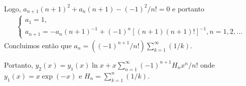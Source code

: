\documentclass[a4paper,12pt, leqno, answers]{exam}
\begin{document}
\begin{questions}
\begin{solution}
\begin{align*}
        \end{align*}
        Logo, $a_{n + 1} (n + 1)^2 + a_n (n + 1) - (-1)^2 / n! = 0$ e portanto
        \begin{align*}
            \begin{cases}
                a_1 = 1, \\
                a_{n + 1} = -a_n (n + 1)^{-1} + (-1)^n \left[ (n + 1) (n + 1)! \right]^{-1}, n = 1, 2, \ldots
            \end{cases}
        \end{align*}
        Concluimos ent\~{a}o que $a_n = \left( (-1)^{n + 1} / n! \right) \sum_{k = 1}^\infty (1/k)$.

        Portanto, $y_2(x) = y_1(x) \ln x + x \sum_{n = 1}^\infty (-1)^{n + 1} H_n x^n / n!$ onde $y_1(x) = x \exp(-x)$ e $H_n = \sum_{k = 1}^n (1/k)$.
    \end{solution}
\end{questions}
\end{document}
